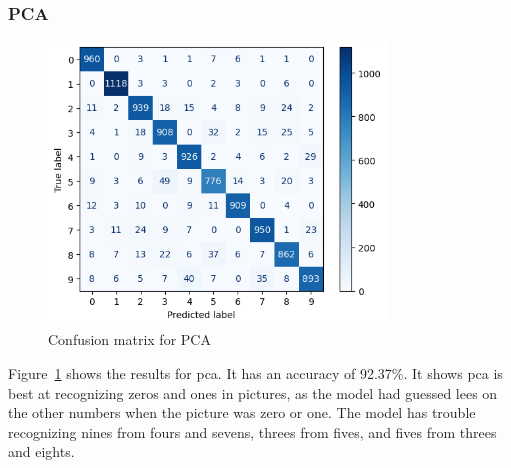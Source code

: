 \subsubsection{PCA}
\begin{figure}[htb!]
    \centering
    \includegraphics[width=0.8\textwidth]{figures/experiment-3/confusion_matrix_pca_svm.png}
    \caption{Confusion matrix for PCA}
    \label{fig:confusion-matrix-pca-svm}
\end{figure}
Figure~\ref{fig:confusion-matrix-pca-svm} shows the results for \gls{pca}. It has an accuracy of 92.37\%. It shows \gls{pca} is best at recognizing zeros and ones in pictures, as the model had guessed lees on the other numbers when the picture was zero or one. The model has trouble recognizing nines from fours and sevens, threes from fives, and fives from threes and eights.  

